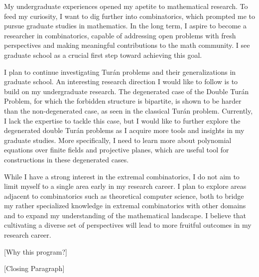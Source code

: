 \documentclass[12pt]{article}
\begin{document}
My undergraduate experiences opened my apetite to mathematical research. To feed my curiosity, I
want to dig further into combinatorics, which prompted me to pursue graduate studies in mathematics.
In the long term, I aspire to become a researcher in combinatorics, capable of addressing open
problems with fresh perspectives and making meaningful contributions to the math community. I see
graduate school as a crucial first step toward achieving this goal.

I plan to continue investigating Turán problems and their generalizations in graduate school. An
interesting research direction I would like to follow is to build on my undergraduate research. The
degenerated case of the Double Turán Problem, for which the forbidden structure is bipartite, is
shown to be harder than the non-degenerated case, as seen in the classical Turán problem. Currently,
I lack the expertise to tackle this case, but I would like to further explore the degenerated double
Turán problems as I acquire more tools and insights in my graduate studies. More specifically, I
need to learn more about polynomial equations over finite fields and projective planes, which are
useful tool for constructions in these degenerated cases.

While I have a strong interest in the extremal combinatorics, I do not aim to limit myself to a
single area early in my research career. I plan to explore areas adjacent to combinatorics such as
theoretical computer science, both to bridge my rather specialized knowledge in extremal
combinatorics with other domains and to expand my understanding of the mathematical landscape. I
believe that cultivating a diverse set of perspectives will lead to more fruitful outcomes in my
research career.

[Why this program?]

[Closing Paragraph]
\end{document}
